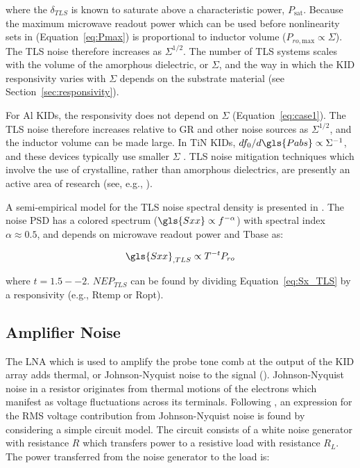 where the $\delta_{TLS}$ is known to saturate above a characteristic power, $P_{\mathrm{sat}}$. Because the maximum microwave readout power which can be used before nonlinearity sets in (Equation~\ref{eq:Pmax}) is proportional to inductor volume ($P_{ro\mathrm{,max}} \propto \Sigma$). The TLS noise therefore increases as $\Sigma^{1/2}$. The number of TLS systems scales with the volume of the amorphous dielectric, or $\Sigma$, and the way in which the KID responsivity varies with $\Sigma$ depends on the substrate material (see Section~\ref{sec:responsivity}).

For Al KIDs, the responsivity does not depend on $\Sigma$ (Equation~\ref{eq:case1}). The TLS noise therefore increases relative to GR and other noise sources as $\Sigma^{1/2}$, and the inductor volume can be made large. In TiN KIDs, $df_{0}/d\gls{Pabs} \propto \Sigma^{-1}$, and these devices typically use smaller $\Sigma$ \citep{mauskopf2018transition}. TLS noise mitigation techniques which involve the use of crystalline, rather than amorphous dielectrics, are presently an active area of research (see, e.g., \citet{weber2011single}).

A semi-empirical model for the TLS noise spectral density is presented in \citet{gao2008semiempirical}. The noise PSD has a colored spectrum ($\gls{Sxx} \propto f^{-\alpha}$) with spectral index $\alpha \approx 0.5$, and depends on microwave readout power and \gls{Tbase} as:

\begin{equation}\label{eq:Sx_TLS}
  \gls{Sxx}_{,TLS} \propto T^{-t}P_{ro}
\end{equation}

where $t = 1.5 -- 2$. $NEP_{TLS}$ can be found by dividing Equation~\ref{eq:Sx_TLS} by a responsivity (e.g., \gls{Rtemp} or \gls{Ropt}).

\subsection{Amplifier Noise}\label{ssec:amp noise}

The LNA which is used to amplify the probe tone comb at the output of the KID array adds thermal, or Johnson-Nyquist noise to the signal (\citet{johnson,nyquist1928thermal}). Johnson-Nyquist noise in a resistor originates from thermal motions of the electrons which manifest as voltage fluctuations across its terminals. Following \citet{kittel1998thermal}, an expression for the RMS voltage contribution from Johnson-Nyquist noise is found by considering a simple circuit model. The circuit consists of a white noise generator with resistance $R$ which transfers power to a resistive load with resistance $R_{L}$. The power transferred from the noise generator to the load is:

